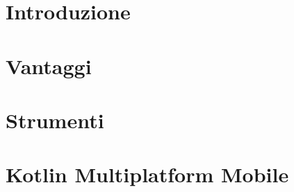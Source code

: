 
\section{Introduzione}

\section{Vantaggi}

\section{Strumenti}

\section{Kotlin Multiplatform Mobile}
